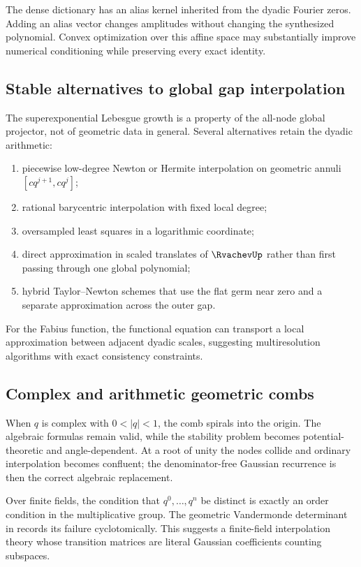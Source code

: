 The dense dictionary has an alias kernel inherited from the dyadic Fourier
zeros.  Adding an alias vector changes amplitudes without changing the
synthesized polynomial.  Convex optimization over this affine space may
substantially improve numerical conditioning while preserving every exact
identity.

\subsection{Stable alternatives to global gap interpolation}

The superexponential Lebesgue growth is a property of the all-node global
projector, not of geometric data in general.  Several alternatives retain
the dyadic arithmetic:
\begin{enumerate}
\item piecewise low-degree Newton or Hermite interpolation on geometric
      annuli $[cq^{j+1},cq^j]$;
\item rational barycentric interpolation with fixed local degree;
\item oversampled least squares in a logarithmic coordinate;
\item direct approximation in scaled translates of $\RvachevUp$ rather than first
      passing through one global polynomial;
\item hybrid Taylor--Newton schemes that use the flat germ near zero and a
      separate approximation across the outer gap.
\end{enumerate}
For the Fabius function, the functional equation can transport a local
approximation between adjacent dyadic scales, suggesting multiresolution
algorithms with exact consistency constraints.

\subsection{Complex and arithmetic geometric combs}

When $q$ is complex with $0<|q|<1$, the comb spirals into the origin.  The
algebraic formulas remain valid, while the stability problem becomes
potential-theoretic and angle-dependent.  At a root of unity the nodes
collide and ordinary interpolation becomes confluent; the denominator-free
Gaussian recurrence is then the correct algebraic replacement.

Over finite fields, the condition that $q^0,\ldots,q^n$ be distinct is
exactly an order condition in the multiplicative group.  The geometric
Vandermonde determinant in  records its
failure cyclotomically.  This suggests a finite-field interpolation theory
whose transition matrices are literal Gaussian coefficients counting
subspaces.

